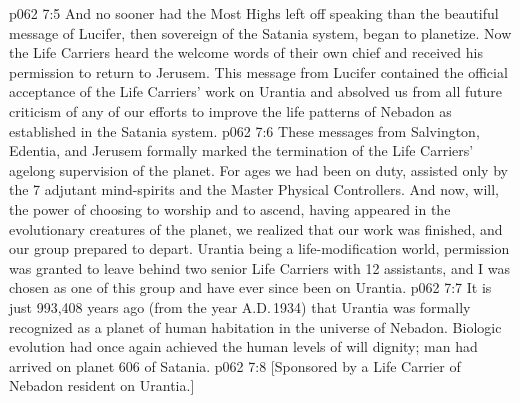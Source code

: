 \vs p062 7:5 And no sooner had the Most Highs left off speaking than the beautiful message of Lucifer, then sovereign of the Satania system, began to planetize. Now the Life Carriers heard the welcome words of their own chief and received his permission to return to Jerusem. This message from Lucifer contained the official acceptance of the Life Carriers’ work on Urantia and absolved us from all future criticism of any of our efforts to improve the life patterns of Nebadon as established in the Satania system.
\vs p062 7:6 These messages from Salvington, Edentia, and Jerusem formally marked the termination of the Life Carriers’ agelong supervision of the planet. For ages we had been on duty, assisted only by the 7 adjutant mind\hyp{}spirits and the Master Physical Controllers. And now, will, the power of choosing to worship and to ascend, having appeared in the evolutionary creatures of the planet, we realized that our work was finished, and our group prepared to depart. Urantia being a life\hyp{}modification world, permission was granted to leave behind two senior Life Carriers with 12 assistants, and I was chosen as one of this group and have ever since been on Urantia.
\vs p062 7:7 It is just 993,408 years ago (from the year A.D.\,1934) that Urantia was formally recognized as a planet of human habitation in the universe of Nebadon. Biologic evolution had once again achieved the human levels of will dignity; man had arrived on planet 606 of Satania.
\vsetoff
\vs p062 7:8 [Sponsored by a Life Carrier of Nebadon resident on Urantia.]
\quizlink
